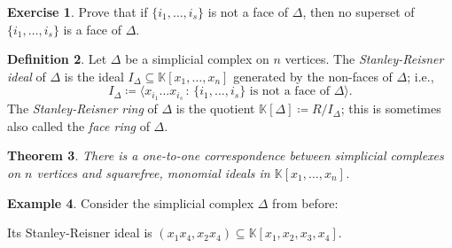 \documentclass[12pt,a4paper]{article}
\newcommand{\KK}{\mathbb{K}}
\newtheorem{theorem}{Theorem}[section]
\theoremstyle{definition}
\newtheorem{definition}[theorem]{Definition}
\newtheorem{example}[theorem]{Example}
\newtheorem{exercise}[theorem]{Exercise}
\numberwithin{equation}{section}
\begin{document}
\begin{exercise}
    Prove that if $\{ i_1, \dots, i_s \}$ is not a face of $\Delta$, then no superset of $\{ i_1, \dots, i_s \}$ is a face of $\Delta$.
\end{exercise}

\begin{definition}
    Let $\Delta$ be a simplicial complex on $n$ vertices.
    The \emph{Stanley-Reisner ideal} of $\Delta$ is the ideal $I_\Delta \subseteq \KK[x_1,\dots,x_n]$ generated by the non-faces of $\Delta$; i.e.,
    \begin{equation*}
        I_\Delta \coloneqq \langle x_{i_1} \dots x_{i_s} \, \colon \, \{ i_1, \dots, i_s \} \text{ is not a face of } \Delta \rangle.
    \end{equation*}
    The \emph{Stanley-Reisner ring} of $\Delta$ is the quotient $\KK[\Delta] \coloneqq R/I_\Delta$; this is sometimes also called the \emph{face ring} of $\Delta$.
\end{definition}

\begin{theorem}
    There is a one-to-one correspondence between simplicial complexes on $n$ vertices and squarefree, monomial ideals in $\KK[x_1,\dots,x_n]$.
\end{theorem}

\begin{example}
    Consider the simplicial complex $\Delta$ from before:
    \begin{center}
    \end{center}
    Its Stanley-Reisner ideal is $(x_1 x_4, x_2 x_4) \subseteq \KK[x_1,x_2,x_3,x_4]$.
\end{example}
\end{document}
